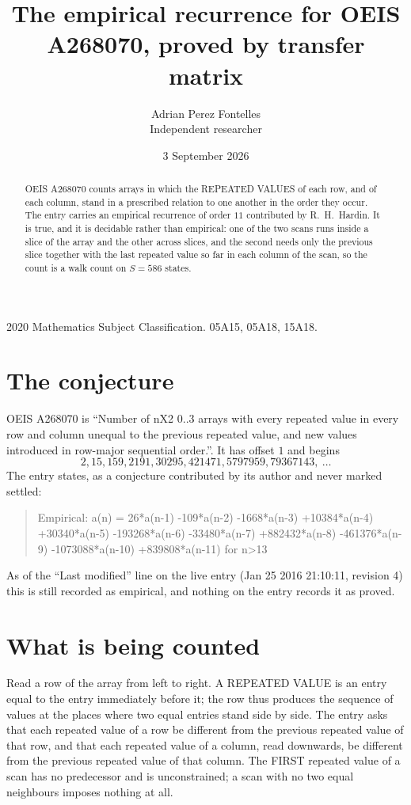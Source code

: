 \documentclass[11pt,a4paper]{article}
\title{The empirical recurrence for OEIS A268070, proved by transfer matrix}
\author{Adrian Perez Fontelles\\ \small Independent researcher}
\date{3 September 2026}
\theoremstyle{plain}
\theoremstyle{definition}
\begin{document}
\maketitle

\begin{abstract}
OEIS A268070 counts arrays in which the REPEATED VALUES of each row, and of each column, stand in a
prescribed relation to one another in the order they occur. The entry carries an empirical
recurrence of order $11$ contributed by R.~H.~Hardin. It is true, and it is decidable
rather than empirical: one of the two scans runs inside a slice of the array and the other
across slices, and the second needs only the previous slice together with the last repeated
value so far in each column of the scan, so the count is a walk count on $S=586$ states.
\end{abstract}

\noindent\small 2020 Mathematics Subject Classification. 05A15, 05A18, 15A18.\normalsize

\section{The conjecture}

OEIS A268070 is ``Number of nX2 0..3 arrays with every repeated value in every row and column unequal to the previous repeated value, and new values introduced in row-major sequential order.''. It has offset $1$ and begins
\[
2, 15, 159, 2191, 30295, 421471, 5797959, 79367143,\ \dots
\]
The entry states, as a conjecture contributed by its author and never marked settled:
\begin{quote}
Empirical: a(n) = 26*a(n-1) -109*a(n-2) -1668*a(n-3) +10384*a(n-4) +30340*a(n-5) -193268*a(n-6) -33480*a(n-7) +882432*a(n-8) -461376*a(n-9) -1073088*a(n-10) +839808*a(n-11) for n>13
\end{quote}
As of the ``Last modified'' line on the live entry (Jan 25 2016 21:10:11, revision 4) this is still
recorded as empirical, and nothing on the entry records it as proved.

\section{What is being counted}

Read a row of the array from left to right. A REPEATED VALUE is an entry equal to the entry
immediately before it; the row thus produces the sequence of values at the places where two
equal entries stand side by side. The entry asks that each repeated value of a row be
different from the previous repeated value of that row, and that each repeated value of a column,
read downwards, be different from the previous repeated value of that column. The FIRST repeated
value of a scan has no predecessor and is unconstrained; a scan with no two equal neighbours
imposes nothing at all.
\end{document}
